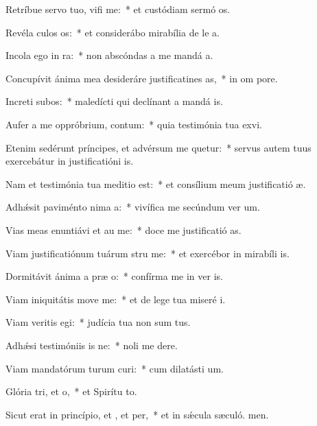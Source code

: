 \item Retríbue servo tuo, vifi me:~* et custódiam sermó os.
\item Revéla culos os:~* et considerábo mirabília de le a.
\item Incola ego  in ra:~* non abscóndas a me mandá a.
\item Concupívit ánima mea desideráre justificatines as,~* in om pore.
\item Increti subos:~* maledícti qui declínant a mandá is.
\item Aufer a me oppróbrium,  contum:~* quia testimónia tua exvi.
\item Etenim sedérunt príncipes, et advérsum me quetur:~* servus autem tuus exercebátur in justificatióni is.
\item Nam et testimónia tua meditio  est:~* et consílium meum justificatió æ.
\item Adhǽsit paviménto nima a:~* vivífica me secúndum ver um.
\item Vias meas enuntiávi et au me:~* doce me justificatió as.
\item Viam justificatiónum tuárum stru me:~* et exercébor in mirabíli is.
\item Dormitávit ánima a præ o:~* confírma me in ver is.
\item Viam iniquitátis move  me:~* et de lege tua miseré i.
\item Viam veritis egi:~* judícia tua non sum tus.
\item Adhǽsi testimóniis is ne:~* noli me dere.
\item Viam mandatórum turum curi:~* cum dilatásti  um.
\item Glória tri, et o,~* et Spirítu to.
\item Sicut erat in princípio, et , et per,~* et in sǽcula sæculó. men.
